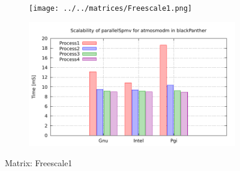 \begin{figure} [ht!]
    \centering
    \captionsetup{justification=centering, singlelinecheck=false}
    \begin{subfigure}{.65\textwidth}
      \centering
      \hspace*{-3.5cm} 
      \texttt{[image: ../../matrices/Freescale1.png]}
      \label{fig:Freescale1_matrix}
    \end{subfigure}%
    \begin{subfigure}{.65\textwidth}
      \centering
      \hspace*{-6.0cm} 
      \includegraphics[page=4, width=0.95\linewidth]{../plots/blackPanther.pdf}
      \label{fig:Freescale1_performance}
    \end{subfigure}
\caption{Matrix: Freescale1}
\label{fig:Freescale1}
\end{figure}

